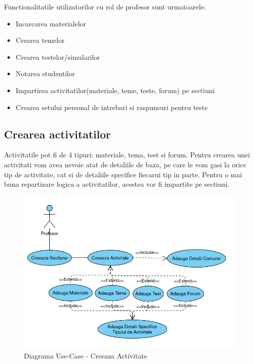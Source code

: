 \documentclass[12pt, a4paper, oneside, romanian]{teza-upb}
\begin{document}
Functionalitatile utilizatorilor cu rol de profesor sunt urmatoarele:
\begin{itemize}
	\item Incarcarea materialelor
	\item Crearea temelor
	\item Crearea testelor/simularilor
	\item Notarea studentilor
	\item Impartirea activitatilor(materiale, teme, teste, forum) pe sectiuni
	\item Crearea setului personal de intrebari si raspunsuri pentru teste
\end{itemize}

\subsection{Crearea activitatilor}

Activitatile pot fi de 4 tipuri: materiale, tema, test si forum. Pentru crearea unei activitati vom avea nevoie atat de detaliile de baza, pe care le vom gasi la orice tip de activitate, cat si de detaliile specifice fiecarui tip in parte. Pentru o mai buna repartizare logica a activitatilor, acestea vor fi impartite pe sectiuni.

\begin{figure}[H]
\centering
\includegraphics*[width=0.9\columnwidth]{diagrama-use-case-creeaza-activitate}
\caption{Diagrama Use-Case - Creeaza Activitate}
\label{diagrama-use-case-creeaza-activitate}
\end{figure}
\end{document}

